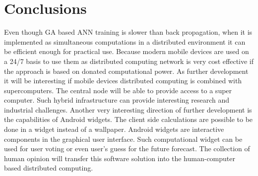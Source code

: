\documentclass{llncs}
\begin{document}
\section{Conclusions}
%
Even though GA based ANN training is slower than back propagation, when it is implemented as simultaneous computations in a distributed environment it can be efficient enough for practical use. Because modern mobile devices are used on a 24/7 basis to use them as distributed computing network is very cost effective if the approach is based on donated computational power. As further development it will be interesting if mobile devices distributed computing is combined with supercomputers. The central node will be able to provide access to a super computer. Such hybrid infrastructure can provide interesting research and industrial challenges. Another very interesting direction of further development is the capabilities of Android widgets. The client side calculations are possible to be done in a widget instead of a wallpaper. Android widgets are interactive components in the graphical user interface. Such computational widget can be used for user voting or even user's guess for the future forecast. The collection of human opinion will transfer this software solution into the human-computer based distributed computing. 
%
\end{document}
